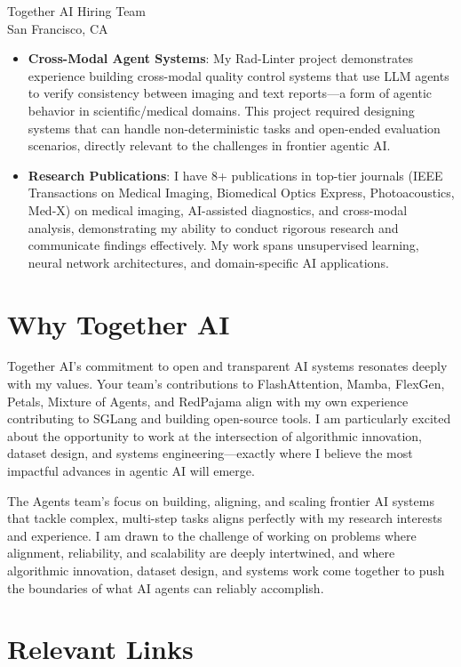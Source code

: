 \documentclass[11pt,a4paper]{letter}
\begin{document}
\begin{letter}{Together AI Hiring Team \\ San Francisco, CA}
\begin{itemize}
\item \textbf{Cross-Modal Agent Systems}: My Rad-Linter project demonstrates experience building cross-modal quality control systems that use LLM agents to verify consistency between imaging and text reports—a form of agentic behavior in scientific/medical domains. This project required designing systems that can handle non-deterministic tasks and open-ended evaluation scenarios, directly relevant to the challenges in frontier agentic AI.

\item \textbf{Research Publications}: I have 8+ publications in top-tier journals (IEEE Transactions on Medical Imaging, Biomedical Optics Express, Photoacoustics, Med-X) on medical imaging, AI-assisted diagnostics, and cross-modal analysis, demonstrating my ability to conduct rigorous research and communicate findings effectively. My work spans unsupervised learning, neural network architectures, and domain-specific AI applications.
\end{itemize}

\section*{Why Together AI}

Together AI's commitment to open and transparent AI systems resonates deeply with my values. Your team's contributions to FlashAttention, Mamba, FlexGen, Petals, Mixture of Agents, and RedPajama align with my own experience contributing to SGLang and building open-source tools. I am particularly excited about the opportunity to work at the intersection of algorithmic innovation, dataset design, and systems engineering—exactly where I believe the most impactful advances in agentic AI will emerge.

The Agents team's focus on building, aligning, and scaling frontier AI systems that tackle complex, multi-step tasks aligns perfectly with my research interests and experience. I am drawn to the challenge of working on problems where alignment, reliability, and scalability are deeply intertwined, and where algorithmic innovation, dataset design, and systems work come together to push the boundaries of what AI agents can reliably accomplish.

\section*{Relevant Links}


\end{letter}
\end{document}

